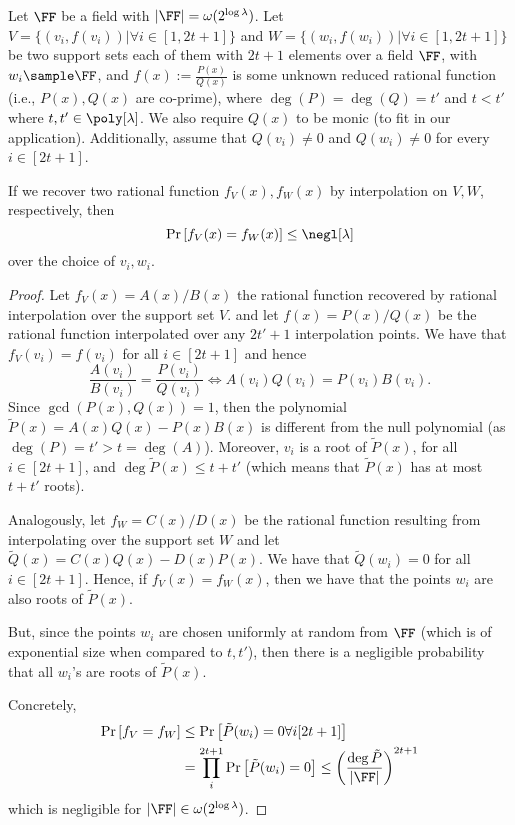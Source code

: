 \begin{lemma}\label{lem:negl-rational}
  Let $\FF$ be a field with $|\FF|=\omega(2^{\log \lambda})$. Let $V=\{(v_i,f(v_i))|\forall i \in [1,2t+1]\}$ and $W=\{(w_i,f(w_i))|\forall i \in [1,2t+1]\}$ be two support sets each of them with $2t+1$ elements over a field $\FF$, with $w_i\sample \FF$, and  $f(x):=\frac{P(x)}{Q(x)}$ is some unknown reduced rational function (i.e., $P(x),Q(x)$ are co-prime), where $\deg(P)=\deg(Q)=t'$ and $t<t'$ where $t,t'\in\poly[\lambda]$. We also require $Q(x)$ to be monic (to fit in our application). Additionally, assume that $Q(v_i)\neq 0$ and $Q(w_i)\neq 0$ for every $i\in[2t+1]$.
  
  If we recover two rational function $f_V(x), f_W(x)$ by interpolation on $V,W$, respectively, then
  $$\Pr\left[f_V(x)=f_W(x)\right]\leq \negl[\lambda]$$ over the choice of $v_i,w_i$.
\end{lemma}
\begin{proof}


Let $f_V(x)=A(x)/B(x)$ the rational function recovered by rational interpolation over the support set $V$.
and let $f(x)=P(x)/Q(x)$ be the rational function interpolated over any $2t'+1$ interpolation points.
We have that $f_V(v_i)=f(v_i)$ for all $i\in [2t+1]$ and hence $$\frac{A(v_i)}{B(v_i)}=\frac{P(v_i)}{Q(v_i)}\Leftrightarrow A(v_i)Q(v_i)=P(v_i)B(v_i).$$ Since $\gcd(P(x),Q(x))=1$, then the polynomial $\tilde P(x)=A(x)Q(x)-P(x)B(x)$ is different from the null polynomial (as $\deg(P)=t'>t=\deg(A)$). Moreover, $v_i$ is a root of $\tilde P(x)$, for all $i\in [2t+1]$, and $\deg\tilde P(x)\leq t+t'$ (which means that $\tilde P(x)$ has at most $t+t'$ roots).

Analogously, let $f_W=C(x)/D(x)$ be the rational function resulting from interpolating over the support set $W$ and let $\tilde Q(x)=C(x)Q(x)-D(x)P(x)$. We have that $\tilde Q(w_i)=0$ for all $i\in [2t+1]$. Hence, if  $f_V(x)=f_W(x)$, then we have that the points $w_i$ are also roots of $\tilde P(x)$. 

But, since the points $w_i$ are chosen uniformly at random from $\FF$ (which is of exponential size when compared to $t,t'$), then there is a negligible probability that all $w_i$'s are roots of $\tilde P(x)$.

Concretely, \begin{align*}
    \Pr\left[f_V=f_W\right]& \leq \Pr\left[\tilde P(w_i)=0 \forall i [2t+1]\right]\\
    &= \prod_i^{2t+1} \Pr\left[\tilde P(w_i)=0 \right] \le \left(\frac{\deg \tilde P}{|\FF|}\right)^{2t+1}
\end{align*}{}
which is negligible for $|\FF|\in\omega(2^{\log \lambda})$.
\end{proof}



